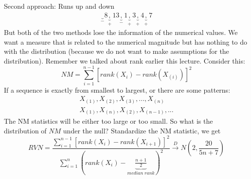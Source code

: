 \documentclass[twoside]{article}
\begin{document}
	Second approach: Runs up and down
	\begin{align}
		\underbrace{\;}_{-} 8 \underbrace{,}_{+} 13 \underbrace{,}_{-} 1 \underbrace{,}_{+} 3 \underbrace{,}_{+} 4 \underbrace{,}_{+} 7 \tag{2}
	\end{align}
	But both of the two methods lose the information of the numerical values. We want a measure that is related to the numerical magnitude but has nothing to do with the distribution (because we do not want to make assumptions for the distribution). Remember we talked about rank earlier this lecture. Consider this:
	$$
	NM = \sum_{i=1}^{n-1} \left[ rank \left( X_i \right) - rank \left( X_{(i)} \right) \right]^2
	$$
	If a sequence is exactly from smallest to largest, or there are some patterns:
	\begin{align}
		X_{(1)}, X_{(2)}, X_{(3)}, ..., X_{(n)} \tag{3} \\
		X_{(1)}, X_{(n)}, X_{(2)}, X_{(n-1)}, ... \tag{4}
	\end{align}
	The NM statistics will be either too large or too small. So what is the distribution of $NM$ under the null? Standardize the NM statistic, we get
	$$
	RVN = \frac{\sum_{i=1}^{n-1} \left[ rank \left( X_{i} \right) - rank \left( X_{i+1} \right) \right]^2}{\sum_{i=1}^{n} ( rank (X_{i}) - \underbrace{\frac{n+1}{2}}_{median \; rank} )^2} \xrightarrow{D} N(2, \frac{20}{5n+7})
	$$
	
\end{document}
